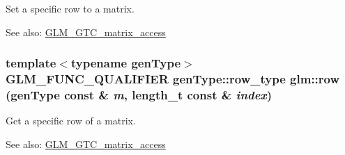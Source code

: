 Set a specific row to a matrix. \begin{Desc}
\item[See also:]\hyperlink{group__gtc__matrix__access}{GLM\_\-GTC\_\-matrix\_\-access} \end{Desc}
\hypertarget{group__gtc__matrix__access_g46e78366e4057c64e554cc442e407cca}{
\subsubsection[row]{\setlength{\rightskip}{0pt plus 5cm}template$<$typename genType$>$ GLM\_\-FUNC\_\-QUALIFIER genType::row\_\-type glm::row (genType const \& {\em m}, \/  length\_\-t const \& {\em index})}}
\label{group__gtc__matrix__access_g46e78366e4057c64e554cc442e407cca}


Get a specific row of a matrix. \begin{Desc}
\item[See also:]\hyperlink{group__gtc__matrix__access}{GLM\_\-GTC\_\-matrix\_\-access} \end{Desc}
